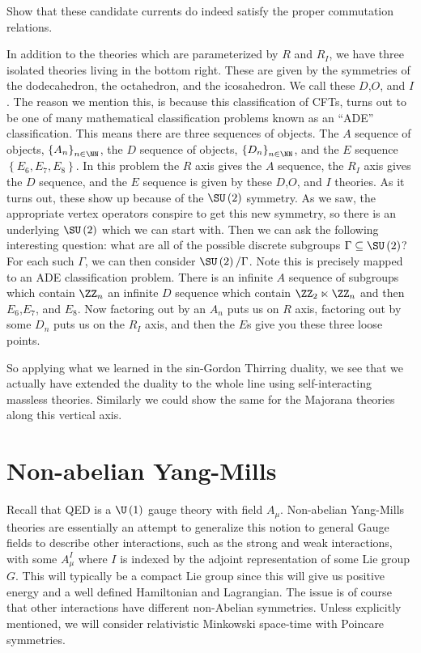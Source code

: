 \documentclass{booc}
\begin{document}
\begin{exr}
Show that these candidate currents do indeed satisfy the proper commutation relations.
\end{exr}

In addition to the theories which are parameterized by $R$ and $R_I$, 
we have three isolated theories living in the bottom right.
These are given by the symmetries of the dodecahedron, the octahedron, and the icosahedron.
We call these $D$,$O$, and $I$.
The reason we mention this, is because this classification of CFTs, turns out 
to be one of many mathematical classification problems
known as an ``ADE'' classification.
This means there are three sequences of objects. 
The $A$ sequence of objects, $\left\{ A_n \right\}_{n\in \NN}$,
the $D$ sequence of objects, $\left\{ D_n \right\}_{n\in \NN}$,
and the $E$ sequence $\left\{ E_6 , E_7, E_8 \right\}$.
In this problem the $R$ axis gives the $A$ sequence, 
the $R_I$ axis gives the $D$ sequence, and the $E$ sequence is given by 
these $D$,$O$, and $I$ theories.
As it turns out, these show up because of the $\SU\left( 2 \right)$ symmetry. 
As we saw, the appropriate vertex operators conspire to get this new symmetry, 
so there is an underlying $\SU\left( 2\right)$ which we can start with.
Then we can ask the following interesting question:
what are all of the possible discrete subgroups $\Gamma \subseteq \SU\left( 2 \right)$?
For each such $\Gamma$, we can then consider $\SU\left( 2 \right) / \Gamma$.
Note this is precisely mapped to an ADE classification problem.
There is an infinite $A$ sequence of subgroups which contain 
$\ZZ_n$
an infinite $D$ sequence which contain
$\ZZ_2 \ltimes \ZZ_n$
and then $E_6$,$E_7$, and $E_8$.
Now factoring out by an $A_n$ puts us on $R$ axis,
factoring out by some $D_n$ puts us on the $R_I$ axis, 
and then the $E$s give you these three loose points.

So applying what we learned in the sin-Gordon Thirring duality,
we see that we actually have extended the duality to 
the whole line using self-interacting massless theories. 
Similarly we could show the same for the Majorana theories along this vertical axis.

\chapter{Non-abelian Yang-Mills}

Recall that QED
is a $\U\left( 1 \right)$ gauge theory with field $A_\mu$.
Non-abelian Yang-Mills theories are essentially an attempt to generalize this notion
to general Gauge fields to describe
other interactions, such as the strong and weak interactions, with some
$A_\mu^I$ where $I$ is indexed by the adjoint
representation of some Lie group $G$.
This will typically be a compact Lie group 
since this will give us positive energy and a well defined
Hamiltonian and Lagrangian.
The issue is of course that other interactions have different non-Abelian symmetries. 
Unless explicitly mentioned, we will consider
relativistic Minkowski space-time with Poincare symmetries.
\end{document}
